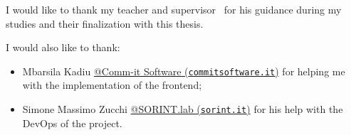 I would like to thank my teacher and supervisor \mysupervisor\ for his guidance during my studies and their fi\-na\-li\-za\-tion with this thesis.
\medskip

I would also like to thank:
 \begin{itemize}[noitemsep]
	\item Mbarsila Kadiu \href{https://www.commitsoftware.it/}{@Comm-it Software (\texttt{commitsoftware.it})} for helping me with the implementation of the \Gls{frontend};
	\item Simone Massimo Zucchi \href{https://www.sorint.it/}{@SORINT.lab (\texttt{sorint.it})} for his help with the \gls{DevOps} of the project.
\end{itemize}

\begin{center}{
	\quad{}\quad{}
}\end{center}